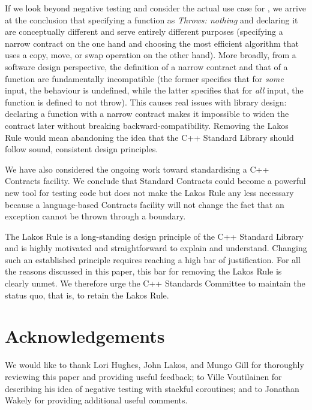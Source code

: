 If we look beyond negative testing and consider the actual use case for , we arrive at the conclusion that specifying a function as \emph{Throws: nothing} and declaring it  are conceptually different and serve entirely different purposes (specifying a narrow contract on the one hand and choosing the most efficient algorithm that uses a copy, move, or swap operation on the other hand). More broadly, from a software design perspective, the definition of a narrow contract and that of a  function are fundamentally incompatible (the former specifies that for \emph{some} input, the behaviour is undefined, while the latter specifies that for \emph{all} input, the function is defined to not throw). This causes real issues with library design: declaring a function with a narrow contract  makes it impossible to widen the contract later without breaking backward-compatibility. Removing the Lakos Rule would mean abandoning the idea that the C++ Standard Library should follow sound, consistent design principles.

We have also considered the ongoing work toward standardising a C++ Contracts facility. We conclude that Standard Contracts could become a powerful new tool for testing code but does not make the Lakos Rule any less necessary because a language-based Contracts facility will not change the fact that an exception cannot be thrown through a  boundary.

The Lakos Rule is a long-standing design principle of the C++ Standard Library and is highly motivated and straightforward to explain and understand. Changing such an established principle requires reaching a high bar of justification. For all the reasons discussed in this paper, this bar for removing the Lakos Rule is clearly unmet. We therefore urge the C++ Standards Committee to maintain the status quo, that is, to retain the Lakos Rule.



\section*{Acknowledgements}

We would like to thank Lori Hughes, John Lakos, and Mungo Gill for thoroughly reviewing this paper and providing useful feedback; to Ville Voutilainen for describing his idea of negative testing with stackful coroutines; and to Jonathan Wakely for providing additional useful comments.

\renewcommand{\bibname}{References}




